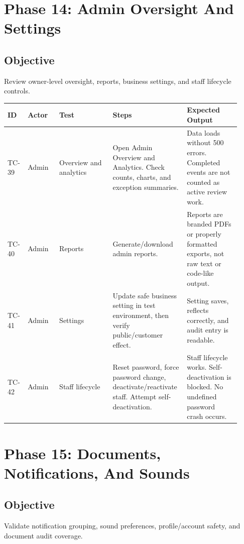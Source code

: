 \documentclass[11pt,a4paper]{article}
\begin{document}
\section{Phase 14: Admin Oversight And Settings}
\subsection{Objective}
Review owner-level oversight, reports, business settings, and staff lifecycle controls.

\begin{longtable}{p{0.07\linewidth}p{0.13\linewidth}p{0.22\linewidth}p{0.28\linewidth}p{0.22\linewidth}}
\toprule
\textbf{ID} & \textbf{Actor} & \textbf{Test} & \textbf{Steps} & \textbf{Expected Output} \\
\midrule
TC-39 & Admin & Overview and analytics & Open Admin Overview and Analytics. Check counts, charts, and exception summaries. & Data loads without 500 errors. Completed events are not counted as active review work. \\
TC-40 & Admin & Reports & Generate/download admin reports. & Reports are branded PDFs or properly formatted exports, not raw text or code-like output. \\
TC-41 & Admin & Settings & Update safe business setting in test environment, then verify public/customer effect. & Setting saves, reflects correctly, and audit entry is readable. \\
TC-42 & Admin & Staff lifecycle & Reset password, force password change, deactivate/reactivate staff. Attempt self-deactivation. & Staff lifecycle works. Self-deactivation is blocked. No undefined password crash occurs. \\
\bottomrule
\end{longtable}

\section{Phase 15: Documents, Notifications, And Sounds}
\subsection{Objective}
Validate notification grouping, sound preferences, profile/account safety, and document audit coverage.
\end{document}
